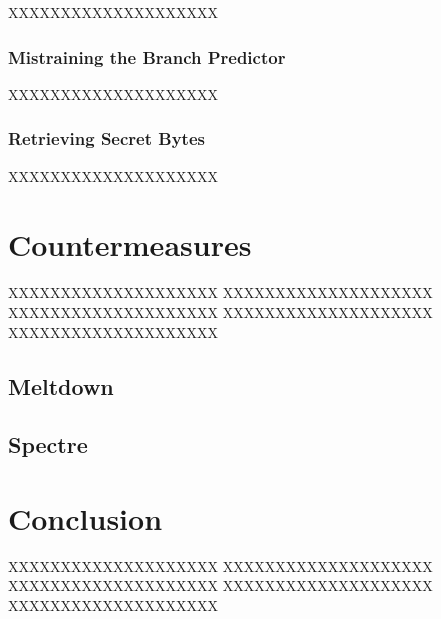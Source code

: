 \documentclass[a4paper,oneside,openright] {scrreprt}
\begin{document}
XXXXXXXXXXXXXXXXXXXX

\subsection{Mistraining the Branch Predictor}
\label{ch:intro:motivation:A}

XXXXXXXXXXXXXXXXXXXX

\subsection{Retrieving Secret Bytes}
\label{ch:intro:motivation:A}

XXXXXXXXXXXXXXXXXXXX

\chapter{Countermeasures}
\label{ch:countermeasures}

XXXXXXXXXXXXXXXXXXXX
XXXXXXXXXXXXXXXXXXXX
XXXXXXXXXXXXXXXXXXXX
XXXXXXXXXXXXXXXXXXXX
XXXXXXXXXXXXXXXXXXXX

\section{Meltdown}
\label{ch:intro:motivation}

\section{Spectre}
\label{ch:intro:motivation}


\chapter{Conclusion}
\label{ch:conclusion}

XXXXXXXXXXXXXXXXXXXX
XXXXXXXXXXXXXXXXXXXX
XXXXXXXXXXXXXXXXXXXX
XXXXXXXXXXXXXXXXXXXX
XXXXXXXXXXXXXXXXXXXX



\end{document}
